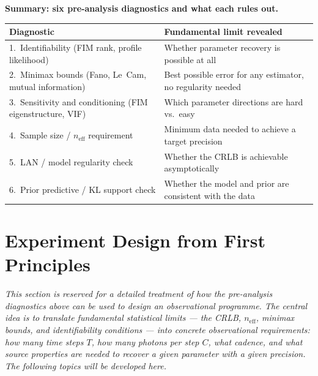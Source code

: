 \documentclass[11pt, a4paper]{article}
\begin{document}
\begin{keybox}
\textbf{Summary: six pre-analysis diagnostics and what each rules out.}

\smallskip
\begin{tabular}{p{3.8cm} p{9.0cm}}
\textbf{Diagnostic} & \textbf{Fundamental limit revealed} \\
\hline
1.\ Identifiability (FIM rank, profile likelihood) &
Whether parameter recovery is possible at all \\
2.\ Minimax bounds (Fano, Le~Cam, mutual information) &
Best possible error for any estimator, no regularity needed \\
3.\ Sensitivity and conditioning (FIM eigenstructure, VIF) &
Which parameter directions are hard vs.\ easy \\
4.\ Sample size / $n_\mathrm{eff}$ requirement &
Minimum data needed to achieve a target precision \\
5.\ LAN / model regularity check &
Whether the CRLB is achievable asymptotically \\
6.\ Prior predictive / KL support check &
Whether the model and prior are consistent with the data \\
\end{tabular}
\end{keybox}

\section{Experiment Design from First Principles}
\label{sec:experiment_design}

\textit{This section is reserved for a detailed treatment of how the pre-analysis
diagnostics above can be used to design an observational programme.
The central idea is to translate fundamental statistical limits --- the CRLB,
$n_\mathrm{eff}$, minimax bounds, and identifiability conditions --- into concrete
observational requirements: how many time steps $T$, how many photons per step $C$,
what cadence, and what source properties are needed to recover a given parameter
with a given precision.
The following topics will be developed here.}
\end{document}
